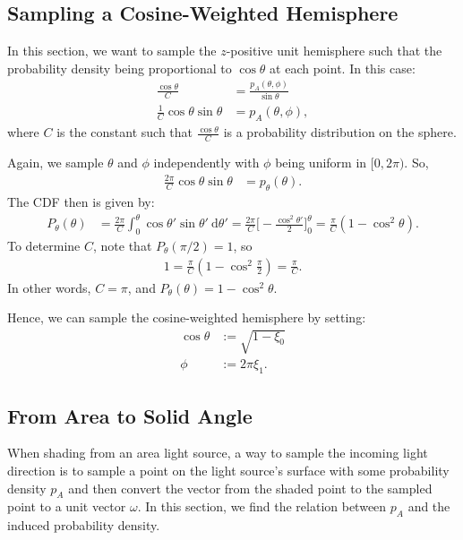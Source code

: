\documentclass[10pt]{article}
\newcommand{\dee}{\mathrm{d}}
\begin{document}
  \subsection{Sampling a Cosine-Weighted Hemisphere}

  In this section, we want to sample the $z$-positive unit hemisphere such that the probability density being proportional to $\cos\theta$ at each point.  In this case:
  \begin{align*}
    \frac{\cos\theta}{C} &= \frac{p_A(\theta,\phi)}{\sin\theta}\\
    \frac{1}{C} \cos\theta\sin\theta &= p_A(\theta,\phi),
  \end{align*}
  where $C$ is the constant such that $\frac{\cos\theta}{C}$ is a probability distribution on the sphere.

  Again, we sample $\theta$ and $\phi$ independently with $\phi$ being uniform in $[0, 2\pi)$. So,
  \begin{align*}
    \frac{2\pi}{C} \cos\theta\sin\theta &= p_\theta(\theta).
  \end{align*}
  The CDF then is given by:
  \begin{align*}
    P_\theta(\theta) 
    &= \frac{2\pi}{C} \int_0^{\theta} \cos\theta'\sin\theta'\ \dee\theta'
    = \frac{2\pi}{C} \bigg[ -\frac{\cos^2 \theta'}{2} \bigg]_0^\theta
    = \frac{\pi}{C} (1 - \cos^2 \theta).
  \end{align*}
  To determine $C$, note that $P_\theta(\pi/2) = 1$, so
  \begin{align*}
    1 = \frac{\pi}{C} (1 - \cos^2 \frac{\pi}{2}) = \frac{\pi}{C}.
  \end{align*}
  In other words, $C = \pi$, and $P_\theta(\theta) = 1 - \cos^2 \theta$.  

  Hence, we can sample the cosine-weighted hemisphere by setting:
  \begin{align*}
    \cos\theta &:= \sqrt{1 - \xi_0} \\
    \phi &:= 2\pi\xi_1.
  \end{align*}  

  \subsection{From Area to Solid Angle}
  \label{area-to-solid-angle}

  When shading from an area light source, a way to sample the incoming light direction is to sample a point on the light source's surface with some probability density $p_A$ and then convert the vector from the shaded point to the sampled point to a unit vector $\omega$.  In this section, we find the relation between $p_A$ and the induced probability density.
\end{document}

